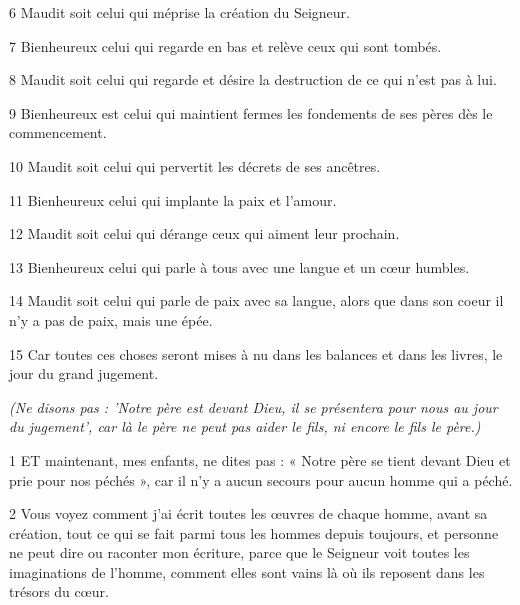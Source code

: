 \par 6 Maudit soit celui qui méprise la création du Seigneur.

\par 7 Bienheureux celui qui regarde en bas et relève ceux qui sont tombés.

\par 8 Maudit soit celui qui regarde et désire la destruction de ce qui n'est pas à lui.

\par 9 Bienheureux est celui qui maintient fermes les fondements de ses pères dès le commencement.

\par 10 Maudit soit celui qui pervertit les décrets de ses ancêtres.

\par 11 Bienheureux celui qui implante la paix et l'amour.

\par 12 Maudit soit celui qui dérange ceux qui aiment leur prochain.

\par 13 Bienheureux celui qui parle à tous avec une langue et un cœur humbles.

\par 14 Maudit soit celui qui parle de paix avec sa langue, alors que dans son coeur il n'y a pas de paix, mais une épée.

\par 15 Car toutes ces choses seront mises à nu dans les balances et dans les livres, le jour du grand jugement.


\par \textit{(Ne disons pas : 'Notre père est devant Dieu, il se présentera pour nous au jour du jugement', car là le père ne peut pas aider le fils, ni encore le fils le père.)}

\par 1 ET maintenant, mes enfants, ne dites pas : « Notre père se tient devant Dieu et prie pour nos péchés », car il n'y a aucun secours pour aucun homme qui a péché.

\par 2 Vous voyez comment j'ai écrit toutes les œuvres de chaque homme, avant sa création, tout ce qui se fait parmi tous les hommes depuis toujours, et personne ne peut dire ou raconter mon écriture, parce que le Seigneur voit toutes les imaginations de l'homme, comment elles sont vains là où ils reposent dans les trésors du cœur.

